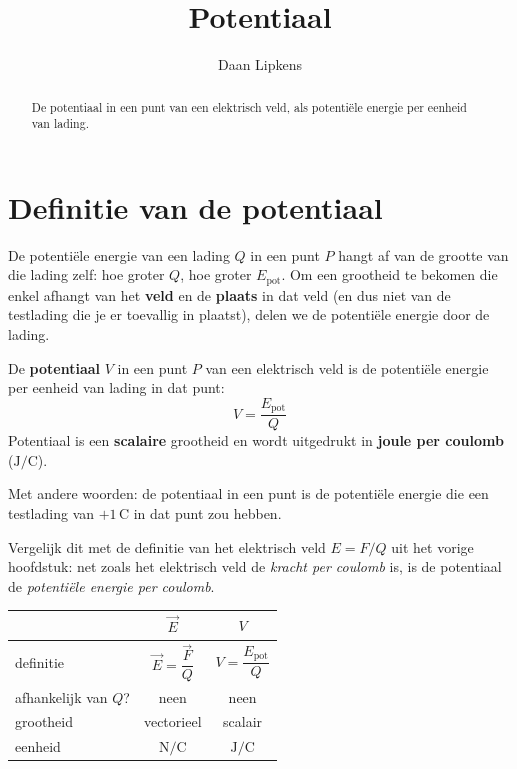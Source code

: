 \documentclass{ximera}
\title{Potentiaal}
\author{Daan Lipkens}
\begin{document}
\begin{abstract}
    De potentiaal in een punt van een elektrisch veld, als potentiële energie per eenheid van lading.
\end{abstract}
\maketitle

\section{Definitie van de potentiaal}
De potentiële energie van een lading $Q$ in een punt $P$ hangt af van de grootte van die lading zelf: hoe groter $Q$, hoe groter $E_{\text{pot}}$. Om een grootheid te bekomen die enkel afhangt van het \textbf{veld} en de \textbf{plaats} in dat veld (en dus niet van de testlading die je er toevallig in plaatst), delen we de potentiële energie door de lading.

\begin{definition}[foldable=true,title={Potentiaal}]\nl
De \textbf{potentiaal} $V$ in een punt $P$ van een elektrisch veld is de potentiële energie per eenheid van lading in dat punt:
\begin{equation}\label{eq:potentiaal_definitie}
    V = \frac{E_{\text{pot}}}{Q}
\end{equation}
Potentiaal is een \textbf{scalaire} grootheid en wordt uitgedrukt in \textbf{joule per coulomb} ($\mathrm{J/C}$).
\end{definition}

Met andere woorden: de potentiaal in een punt is de potentiële energie die een testlading van $+1 \, \mathrm{C}$ in dat punt zou hebben.

\begin{remark}[expandable=true,title={Analogie met het elektrisch veld}]\nl
Vergelijk dit met de definitie van het elektrisch veld $E = F/Q$ uit het vorige hoofdstuk: net zoals het elektrisch veld de \emph{kracht per coulomb} is, is de potentiaal de \emph{potentiële energie per coulomb}.
\begin{center}
\begin{tabular}{lcc}
    & $\vec{E}$ & $V$ \\ \hline
    \rule{0pt}{6mm}definitie & $\vec{E}=\dfrac{\vec{F}}{Q}$ & $V=\dfrac{E_{\text{pot}}}{Q}$ \\
    afhankelijk van $Q$? & neen & neen \\
    grootheid & vectorieel & scalair \\
    eenheid & $\mathrm{N/C}$ & $\mathrm{J/C}$
\end{tabular}
\end{center}
\end{remark}
\end{document}
